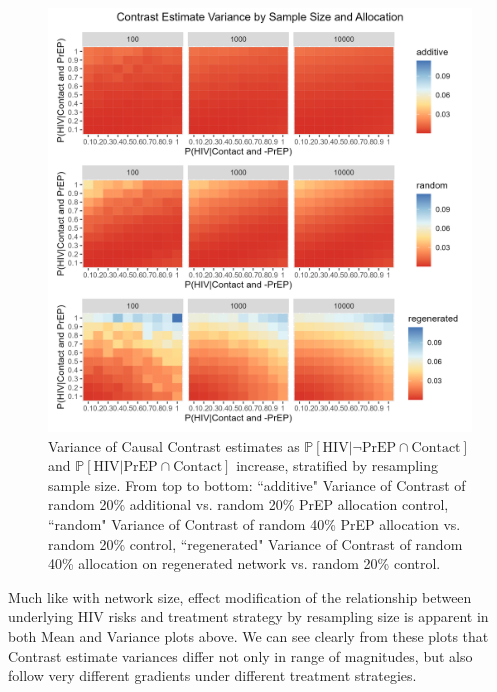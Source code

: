 \documentclass{article}
\theoremstyle{definition}
\begin{document}
\begin{figure}[H]
    \centering
    \includegraphics[width=\linewidth]{Figures/Sample Size Variance plots.png}
    \caption{Variance of Causal Contrast estimates as $\mathbb{P}\left[\text{HIV} \vert \neg \text{PrEP} \cap \text{Contact}\right]$ and $\mathbb{P}\left[\text{HIV} \vert \text{PrEP} \cap \text{Contact}\right]$ increase, stratified by resampling sample size. From top to bottom: ``additive" Variance of Contrast of random 20\% additional vs. random 20\% PrEP allocation control, ``random" Variance of Contrast of random 40\% PrEP allocation vs. random 20\% control, ``regenerated" Variance of Contrast of random 40\% allocation on regenerated network vs. random 20\% control.}
    \label{ffig:Figure S4.4}
\end{figure}
Much like with network size, effect modification of the relationship between underlying HIV risks and treatment strategy by resampling size is apparent in both Mean and Variance plots above. We can see clearly from these plots that Contrast estimate variances differ not only in range of magnitudes, but also follow very different gradients under different treatment strategies.
\end{document}
